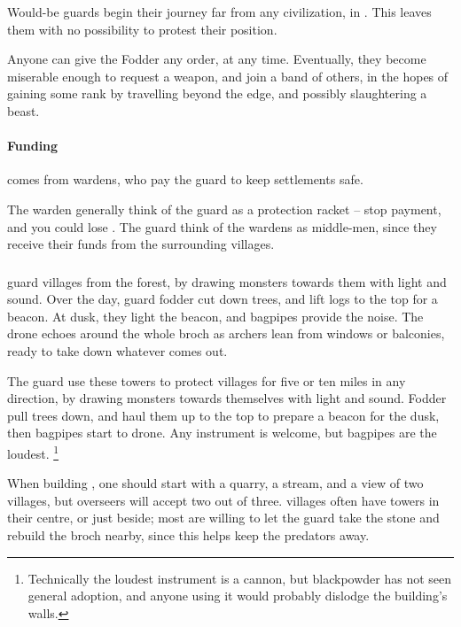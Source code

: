 \begin{multicols}{2}
\begin{description}
\end{description}

\noindent
Would-be \glspl{guard} begin their journey far from any civilization, in .
This leaves them with no possibility to protest their position.

Anyone can give the Fodder any order, at any time.
Eventually, they become miserable enough to request a weapon, and join a band of others, in the hopes of gaining some rank by travelling beyond the \gls{edge}, and possibly slaughtering a beast.


\paragraph{Funding}
comes from \glspl{warden}, who pay the guard to keep settlements safe.

The \gls{warden} generally think of the \gls{guard} as a protection racket -- stop payment, and you could lose .
The \gls{guard} think of the \glspl{warden} as middle-men, since they receive their funds from the surrounding \glspl{village}.

\subsubsection{}
guard \glspl{village} from the forest, by drawing monsters towards them with light and sound.
Over the day, \gls{guard} fodder cut down trees, and lift logs to the top for a beacon.
At dusk, they light the beacon, and bagpipes provide the noise.
The drone echoes around the whole \gls{broch} as archers lean from windows or balconies, ready to take down whatever comes out.

The \gls{guard} use these towers to protect \glspl{village} for five or ten miles in any direction, by drawing monsters towards themselves with light and sound.
Fodder pull trees down, and haul them up to the top to prepare a beacon for the dusk, then bagpipes start to drone.
Any instrument is welcome, but bagpipes are the loudest.%
\footnote{Technically the loudest instrument is a cannon, but blackpowder has not seen general adoption, and anyone using it would probably dislodge the building's walls.}

When building , one should start with a quarry, a stream, and a view of two \glspl{village}, but overseers will accept two out of three.
\Glspl{village} often have towers in their centre, or just beside; most are willing to let the \gls{guard} take the stone and rebuild the \gls{broch} nearby, since this helps keep the predators away.


\end{multicols}
